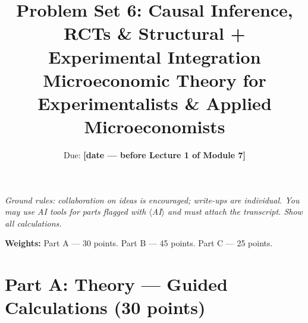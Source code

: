 \documentclass[11pt]{article}
\title{Problem Set 6: Causal Inference, RCTs \& Structural + Experimental
Integration\\
\large Microeconomic Theory for Experimentalists \& Applied Microeconomists}
\author{Due: \textbf{[date --- before Lecture 1 of Module 7]}}
\date{}
\begin{document}
\maketitle

\noindent\emph{Ground rules: collaboration on ideas is encouraged; write-ups
are individual. You may use AI tools for parts flagged with
$\langle$AI$\rangle$ and must attach the transcript. Show all calculations.}

\medskip

\noindent\textbf{Weights:} Part A --- 30 points. Part B --- 45 points.
Part C --- 25 points.

\bigskip

\section*{Part A: Theory --- Guided Calculations (30 points)}
\end{document}
